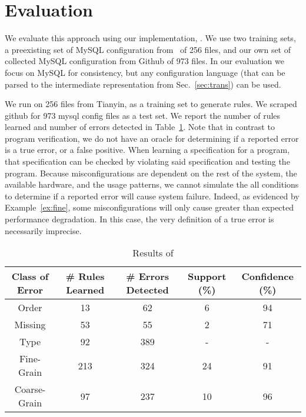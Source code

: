 
\section{Evaluation}

We evaluate this approach using our implementation, \app.
We use two training sets, a preexisting set of MySQL configuration from~\cite{xu15systems} of 256 files,
 and our own set of collected MySQL configuration from Github of 973 files.
In our evaluation we focus on MySQL for consistency, but any configuration language (that can be parsed to the intermediate representation from Sec.~\ref{sec:trans}) can be used.

We run \app on 256 files from Tianyin, as a training set to generate rules.
We scraped github for 973 mysql config files as a test set.
We report the number of rules learned and number of errors detected in Table~\ref{table:learning}.
Note that in contrast to program verification, we do not have an oracle for determining if a reported error is a true error, or a false positive.
When learning a specification for a program, that specification can be checked by violating said specification and testing the program.
Because misconfigurations are dependent on the rest of the system, the available hardware, and the usage patterns, we cannot simulate the all conditions to determine if a reported error will cause system failure.
Indeed, as evidenced by Example~\ref{ex:fine}, some misconfigurations will only cause greater than expected performance degradation.
In this case, the very definition of a true error is necessarily imprecise.

\begin{table}[h]
\centering
\caption{Results of \app}
\label{table:learning}
\setlength{\tabcolsep}{0.5em}
\begin{tabular}{|c|c|c|c|c|}
\hline
{\bf Class of Error } & {\bf \# Rules Learned} & {\bf \# Errors Detected} & {\bf Support (\%)} & {\bf Confidence (\%)}\\ 
\hline
\hline
Order        & 13  & 62   & 6 & 94 \\ 
Missing      & 53  & 55   & 2  & 71 \\ 
Type         & 92  & 389  & -  & -  \\ 
Fine-Grain   & 213 & 324  & 24 & 91 \\ 
Coarse-Grain & 97  & 237  & 10 & 96\\ 
\hline 
\end{tabular}
\end{table}

